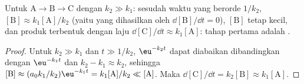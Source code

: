 \begin{proposition}\label{prop:b1:elementary-steps:qssa-justified}
Untuk $\mathrm{A} \to \mathrm{B} \to \mathrm{C}$ dengan $k_2 \gg k_1$:
sesudah waktu yang berorde $1/k_2$, $[\mathrm{B}] \approx k_1[\mathrm{A}]/k_2$ (yaitu
yang dihasilkan oleh $\dd[\mathrm{B}]/\dd t = 0$), $[\mathrm{B}]$ tetap kecil, dan
produk terbentuk dengan laju $\dd[\mathrm{C}]/\dd t \approx k_1[\mathrm{A}]$:
tahap pertama adalah .
\end{proposition}

\begin{proof}
Untuk $k_2 \gg k_1$ dan $t \gg 1/k_2$, $\eu^{-k_2t}$ dapat diabaikan
dibandingkan dengan $\eu^{-k_1t}$ dan $k_2 - k_1 \approx k_2$, sehingga
$[\mathrm{B}] \approx (a_0k_1/k_2)
\eu^{-k_1t} = k_1[\mathrm{A}]/k_2 \ll [\mathrm{A}]$. Maka
$\dd[\mathrm{C}]/\dd t = k_2[\mathrm{B}] \approx k_1[\mathrm{A}]$.
\end{proof}


